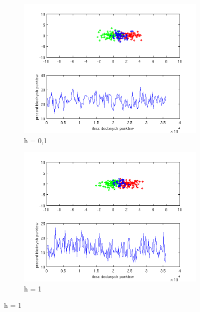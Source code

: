 \documentclass[10pt,a4paper]{article}
\begin{document}
\begin{figure}[H]
   \begin{subfigure}[b]{0.5\textwidth}
    \includegraphics[width=\textwidth]{test_h0_1.png}
    \caption{h = 0,1}
  \end{subfigure}
  \hfill
  \begin{subfigure}[b]{0.5\textwidth}
    \includegraphics[width=\textwidth]{test_h1.png}
    \caption{h = 1}
  \end{subfigure}
  

\end{figure}
\end{document}
